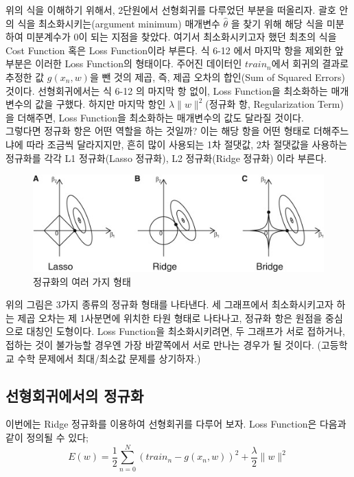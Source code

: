 \documentclass[a4paper]{oblivoir}
\begin{document}
\indent 위의 식을 이해하기 위해서, 2단원에서 선형회귀를 다루었던 부분을 떠올리자. 괄호 안의 식을 최소화시키는(argument minimum) 매개변수 $\hat{\theta}$ 을 찾기 위해 해당 식을 미분하여 미분계수가 0이 되는 지점을 찾았다. 여기서 최소화시키고자 했던 최초의 식을 Cost Function 혹은 Loss Function이라 부른다. 식 6-12 에서 마지막 항을 제외한 앞 부분은 이러한 Loss Function의 형태이다. 주어진 데이터인 $train_{n}$에서 회귀의 결과로 추정한 값 $g(x_{n}, w)$을 뺀 것의 제곱, 즉, 제곱 오차의 합인(Sum of Squared Errors) 것이다. 선형회귀에서는 식 6-12 의 마지막 항 없이, Loss Function을 최소화하는 매개변수의 값을 구했다. 하지만 마지막 항인 $\lambda \|w\|^{2}$(정규화 항, Regularization Term)을 더해주면, Loss Function을 최소화하는 매개변수의 값도 달라질 것이다. \\
\indent 그렇다면 정규화 항은 어떤 역할을 하는 것일까? 이는 해당 항을 어떤 형태로 더해주느냐에 따라 조금씩 달라지지만, 흔히 많이 사용되는 1차 절댓값, 2차 절댓값을 사용하는 정규화를 각각 L1 정규화(Lasso 정규화), L2 정규화(Ridge 정규화) 이라 부른다.
\begin{figure}[ht]
\centering
\includegraphics[scale=0.8]{L1_L2_Regularization.png}
\caption{정규화의 여러 가지 형태}
\label{Figure 6-8}
\end{figure}

\indent 위의 그림은 3가지 종류의 정규화 형태를 나타낸다. 세 그래프에서 최소화시키고자 하는 제곱 오차는 제 1사분면에 위치한 타원 형태로 나타나고, 정규화 항은 원점을 중심으로 대칭인 도형이다. Loss Function을 최소화시키려면, 두 그래프가 서로 접하거나, 접하는 것이 불가능할 경우엔 가장 바깥쪽에서 서로 만나는 경우가 될 것이다. (고등학교 수학 문제에서 최대/최소값 문제를 상기하자.)

\subsection{선형회귀에서의 정규화}
이번에는 Ridge 정규화를 이용하여 선형회귀를 다루어 보자. Loss Function은 다음과 같이 정의될 수 있다;
\begin{equation}
E(w) = \frac{1}{2}\sum_{n=0}^{N}\left(train_{n} - g(x_{n}, w) \right)^{2} + \frac{\lambda}{2} \|w\|^{2} \tag{6-13}
\end{equation}
\end{document}
